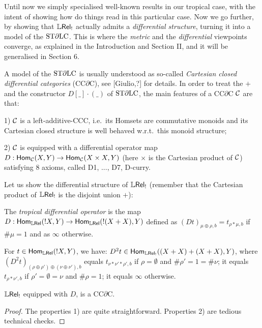 Until now we simply specialised well-known results in our tropical case, with the intent of showing how do things read in this particular case.
Now we go further, by showing that $\mathbb{L} \mathsf{Rel}_!$ actually admits a \emph{differential structure}, turning it into a model of the $\mathrm{ST}\partial\mathrm{LC}$.
This is where the \emph{metric} and the \emph{differential} viewpoints converge, as explained in the Introduction and Section II, and it will be generalised in Section 6.

A model of the $\mathrm{ST}\partial\mathrm{LC}$ is usually understood as so-called \emph{Cartesian closed differential categories} (CC$\partial$C), see [Giulio,?] for details.
In order to treat the $+$ and the constructor $D[\_]\cdot (\_)$ of $\mathrm{ST}\partial\mathrm{LC}$, the main features of a CC$\partial$C $\mathcal{C}$ are that:

1) $\mathcal{C}$ is a left-additive-CCC, i.e.\ its Homsets are commutative monoids and its Cartesian closed structure is well behaved w.r.t.\ this monoid structure;

2) $\mathcal{C}$ is equipped with a differential operator map $D:\mathsf{Hom}_{\mathcal{C}}(X,Y)\to \mathsf{Hom}_{\mathcal{C}}(X\times X,Y)$ (here $\times$ is the Cartesian product of $\mathcal{C}$) satisfying $8$ axioms, called D1, ..., D7, D-curry.

Let us show the differential structure of $\mathbb{L} \mathsf{Rel}_!$ (remember that the Cartesian product of $\mathbb{L} \mathsf{Rel}_!$ is the disjoint union $+$): 

\begin{definition}
 The \emph{tropical differential operator} is the map $D:\mathsf{Hom}_{\mathbb{L} \mathsf{Rel}}(!X,Y)\to \mathsf{Hom}_{\mathbb{L} \mathsf{Rel}}(!(X+X),Y)$ defined as $(Dt)_{\mu\oplus\rho,b}=t_{\rho*\mu,b}$ if $\#\mu=1$ and as $\infty$ otherwise.
\end{definition}

\begin{remark}
For $t\in\mathsf{Hom}_{\mathbb{L} \mathsf{Rel}}(!X,Y)$, we have:
 $D^2 t\in\mathsf{Hom}_{\mathbb{L} \mathsf{Rel}_!}((X+X)+(X+X),Y)$, where $(D^2 t)_{(\rho\oplus\rho')\oplus(\nu\oplus\nu'),b}$ equals $t_{\nu*\nu'*\rho',b}$ if $\rho=\emptyset$ and $\#\rho'=1=\#\nu$; it equals $t_{\rho*\nu',b}$ if $\rho'=\emptyset=\nu$ and $\#\rho=1$; it equals $\infty$ otherwise.
\end{remark}

\begin{theorem}\label{thm:LREL!CCDC}
 $\mathbb{L} \mathsf{Rel}_!$ equipped with $D$, is a CC$\partial$C.
\end{theorem}
\begin{proof}
 The properties 1) are quite straightforward.
 Properties 2) are tedious technical checks.
\end{proof}

